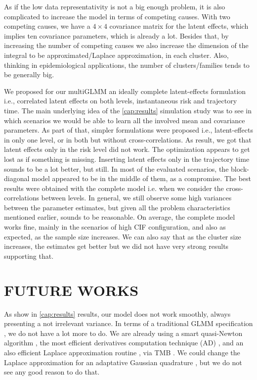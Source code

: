 As if the low data representativity is not a big enough problem, it is
also complicated to increase the model in terms of competing
causes. With two competing causes, we have a \(4\times4\) covariance
matrix for the latent effects, which implies ten covariance parameters,
which is already a lot. Besides that, by increasing the number of
competing causes we also increase the dimension of the integral to be
approximated/Laplace approximation, in each cluster. Also, thinking in
epidemiological applications, the number of clusters/families tends to
be generally big.

We proposed for our multiGLMM an ideally complete latent-effects
formulation i.e., correlated latent effects on both levels,
instantaneous risk and trajectory time. The main underlying idea of the
\autoref{cap:results} simulation study was to see in which scenarios
we would be able to learn all the involved mean and covariance
parameters. As part of that, simpler formulations were proposed i.e.,
latent-effects in only one level, or in both but without
cross-correlations. As result, we got that latent effects only in the
risk level did not work. The optimization appears to get lost as if
something is missing. Inserting latent effects only in the trajectory
time sounds to be a lot better, but still. In most of the evaluated
scenarios, the block-diagonal model appeared to be in the middle of
them, as a compromise. The best results were obtained with the complete
model i.e. when we consider the cross-correlations between levels. In
general, we still observe some high variances between the parameter
estimates, but given all the problem characteristics mentioned earlier,
sounds to be reasonable. On average, the complete model works fine,
mainly in the scenarios of high CIF configuration, and also as expected,
as the sample size increases. We can also say that as the cluster size
increases, the estimates get better but we did not have very strong
results supporting that.

\section{FUTURE WORKS}
\label{cap:future}

As show in \autoref{cap:results} results, our model does not work
smoothly, always presenting a not irrelevant variance. In terms of a
traditional GLMM specification \cite{GLMM}, we do not have a lot more to
do. We are already using a smart quasi-Newton algorithm
\cite{PORTpaper}, the most efficient derivatives computation technique
(AD) \cite{peyre}, and an also efficient Laplace approximation routine
\cite{corestats, patrao}, via TMB \cite{TMB}. We could change the
Laplace approximation for an adaptative Gaussian quadrature
\cite{quadrature}, but we do not see any good reason to do that.

